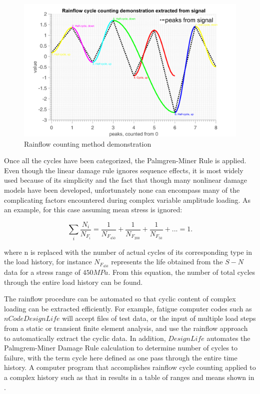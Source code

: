 \begin{figure}[h!]
	\centering
	\includegraphics[width=\textwidth]{figures//rfdemo.png} 
	\caption{Rainflow counting method demonstration}
	\label{rfdemo}
\end{figure}  

Once all the cycles have been categorized, the Palmgren-Miner Rule is applied. Even though the linear damage rule ignores sequence effects, it is most widely used because of its simplicity and the fact that though many nonlinear damage models have been developed, unfortunately none can encompass many of the complicating factors encountered during complex variable amplitude loading. As an example, for this case assuming mean stress is ignored:

$$\sum_i \frac{N_i}{N_{F_i}}=\frac{1}{N_{F_{450}}}+\frac{1}{N_{F_{200}}}+\frac{1}{N_{F_{50}}}+...=1.$$

where n is replaced with the number of actual cycles of its corresponding type in the load history, for instance $N_{F_{450}}$ represents the life obtained from the $S-N$ data for a stress range of $450MPa$.  From this equation, the number of total cycles through the entire load history can be found.

The rainflow procedure can be automated so that cyclic content of complex loading can be extracted efficiently.  For example, fatigue computer codes such as $nCode DesignLife$ will accept files of test data, or the input of multiple load steps from a static or transient finite element analysis, and use the rainflow approach to automatically extract the cyclic data.  In addition, $DesignLife$ automates the Palmgrem-Miner Damage Rule calculation to determine number of cycles to failure, with the term cycle here defined as one pass through the entire time history. A computer program that accomplishes rainflow cycle counting applied to a complex history such as that in  results in a table of ranges and means shown in .

